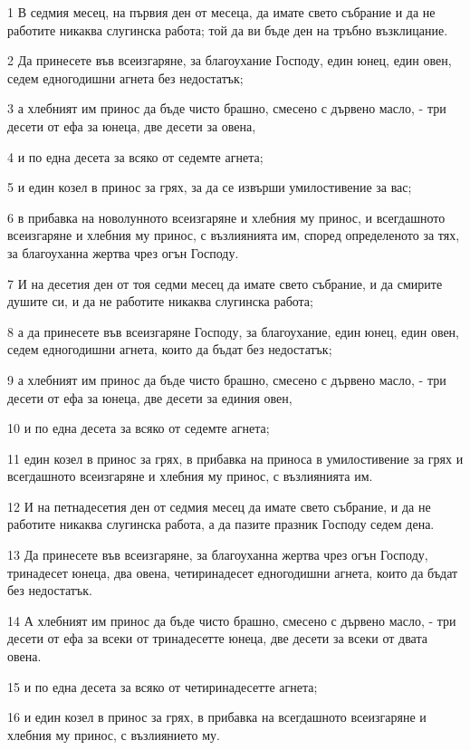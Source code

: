 \par 1 В седмия месец, на първия ден от месеца, да имате свето събрание и да не работите никаква слугинска работа; той да ви бъде ден на тръбно възклицание.
\par 2 Да принесете във всеизгаряне, за благоухание Господу, един юнец, един овен, седем едногодишни агнета без недостатък;
\par 3 а хлебният им принос да бъде чисто брашно, смесено с дървено масло, - три десети от ефа за юнеца, две десети за овена,
\par 4 и по една десета за всяко от седемте агнета;
\par 5 и един козел в принос за грях, за да се извърши умилостивение за вас;
\par 6 в прибавка на новолунното всеизгаряне и хлебния му принос, и всегдашното всеизгаряне и хлебния му принос, с възлиянията им, според определеното за тях, за благоуханна жертва чрез огън Господу.
\par 7 И на десетия ден от тоя седми месец да имате свето събрание, и да смирите душите си, и да не работите никаква слугинска работа;
\par 8 а да принесете във всеизгаряне Господу, за благоухание, един юнец, един овен, седем едногодишни агнета, които да бъдат без недостатък;
\par 9 а хлебният им принос да бъде чисто брашно, смесено с дървено масло, - три десети от ефа за юнеца, две десети за единия овен,
\par 10 и по една десета за всяко от седемте агнета;
\par 11 един козел в принос за грях, в прибавка на приноса в умилостивение за грях и всегдашното всеизгаряне и хлебния му принос, с възлиянията им.
\par 12 И на петнадесетия ден от седмия месец да имате свето събрание, и да не работите никаква слугинска работа, а да пазите празник Господу седем дена.
\par 13 Да принесете във всеизгаряне, за благоуханна жертва чрез огън Господу, тринадесет юнеца, два овена, четиринадесет едногодишни агнета, които да бъдат без недостатък.
\par 14 А хлебният им принос да бъде чисто брашно, смесено с дървено масло, - три десети от ефа за всеки от тринадесетте юнеца, две десети за всеки от двата овена.
\par 15 и по една десета за всяко от четиринадесетте агнета;
\par 16 и един козел в принос за грях, в прибавка на всегдашното всеизгаряне и хлебния му принос, с възлиянието му.
